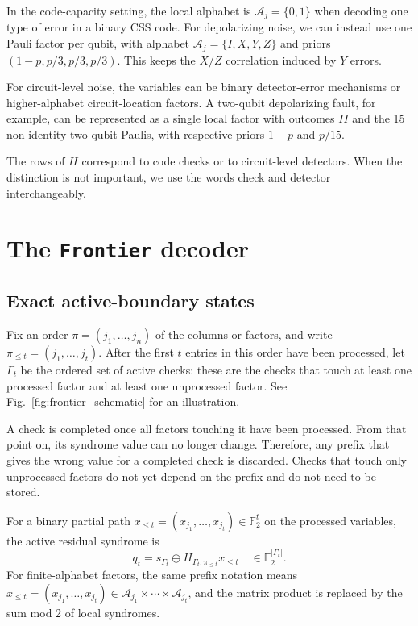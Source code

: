 \documentclass[a4paper,twocolumn,11pt,unpublished]{quantumarticle}
\newcommand{\frontier}{\texttt{Frontier}}
\newcommand{\A}{\mathcal{A}}
\newcommand{\GF}{\mathbb{F}_2}
\begin{document}
In the code-capacity setting, the local alphabet is \(\A_j=\{0,1\}\) when decoding one type of error in a binary CSS code. For depolarizing noise, we can instead use one Pauli factor per qubit, with alphabet \(\A_j=\{I,X,Y,Z\}\) and priors \((1-p,p/3,p/3,p/3)\). This keeps the \(X/Z\) correlation induced by \(Y\) errors.

For circuit-level noise, the variables can be binary detector-error mechanisms or higher-alphabet circuit-location factors. A two-qubit depolarizing fault, for example, can be represented as a single local factor with outcomes \(II\) and the 15 non-identity two-qubit Paulis, with respective priors \(1-p\) and \(p/15\).

The rows of \(H\) correspond to code checks or to circuit-level detectors. When the distinction is not important, we use the words check and detector interchangeably.

\section{The \frontier{} decoder}
\label{sec:decoder}

\subsection{Exact active-boundary states}

Fix an order \(\pi=(j_1,\ldots,j_n)\) of the columns or factors, and write
\(\pi_{\le t}=(j_1,\ldots,j_t)\).  After the first \(t\) entries in this order
have been processed, let \(\Gamma_t\) be the ordered set of active checks:
these are the checks that touch at least one processed factor and at least one
unprocessed factor. See Fig.~\ref{fig:frontier_schematic} for an illustration.

A check is completed once all factors touching it have been processed. From
that point on, its syndrome value can no longer change. Therefore, any prefix
that gives the wrong value for a completed check is discarded. Checks that touch
only unprocessed factors do not yet depend on the prefix and do not need to be
stored.

For a binary partial path
\(x_{\le t}=(x_{j_1},\ldots,x_{j_t})\in\GF^t\) on the processed variables, the
active residual syndrome is
\begin{equation}
    q_t
    =
    s_{\Gamma_t}
    \oplus
    H_{\Gamma_t,\pi_{\le t}}x_{\le t}
    \quad\in\GF^{|\Gamma_t|}.
    \label{eq:frontier_residual}
\end{equation}
For finite-alphabet factors, the same prefix notation means
\(x_{\le t}=(x_{j_1},\ldots,x_{j_t})\in
\A_{j_1}\times\cdots\times\A_{j_t}\), and the matrix product is replaced by
the sum mod 2 of local syndromes.
\end{document}
